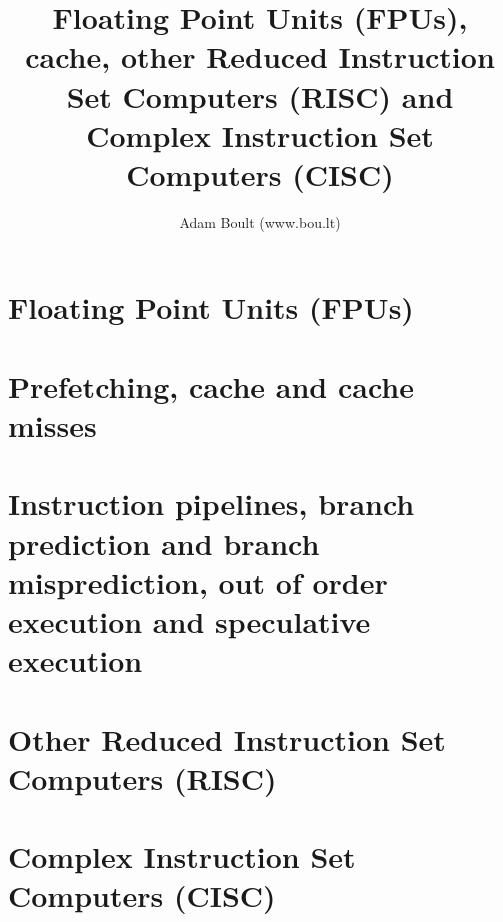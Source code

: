 \documentclass[oneside]{book}
\begin{document}
\author{Adam Boult (www.bou.lt)}
\title{Floating Point Units (FPUs), cache, other Reduced Instruction Set Computers (RISC) and Complex Instruction Set Computers (CISC)}
\maketitle

\setcounter{tocdepth}{0}
\tableofcontents



\part{Floating Point Units (FPUs)}

\part{Prefetching, cache and cache misses}

\part{Instruction pipelines, branch prediction and branch misprediction, out of order execution and speculative execution}

\part{Other Reduced Instruction Set Computers (RISC)}








\part{Complex Instruction Set Computers (CISC)}






\end{document}
